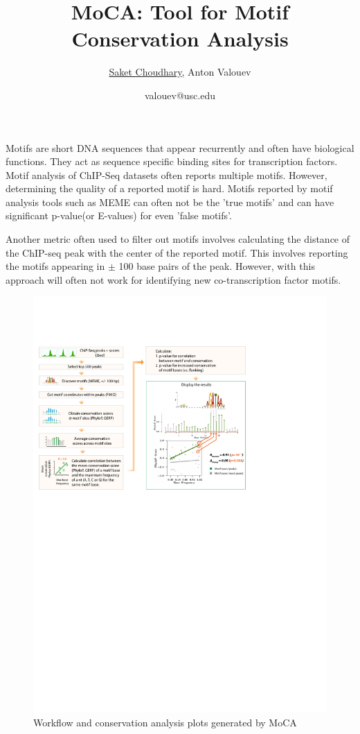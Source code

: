 \documentclass[16pt,a4paper]{article}
\title{\textbf{MoCA: Tool for Motif Conservation Analysis}}
\author{\underline{Saket Choudhary}, Anton Valouev}
\date{valouev@usc.edu}
\begin{document}
\maketitle
Motifs are short DNA sequences that appear recurrently and often have biological functions. They act as sequence specific binding sites for transcription factors. Motif analysis of ChIP-Seq datasets often reports multiple motifs. However, determining the quality of a reported motif is hard. Motifs reported by motif analysis tools such as MEME\cite{bailey2015meme} can often not be the 'true motifs' and  can have significant p-value(or E-values) for even 'false motifs'. 


Another metric often used to filter out motifs involves calculating the distance of the ChIP-seq peak with the center of the reported motif. This involves reporting the motifs appearing in $\pm$ 100 base pairs of the peak. 
However, with this approach will often not work for
identifying new co-transcription factor motifs.

\begin{figure}
	\centering
	\includegraphics[scale=0.7]{workflow}
	\caption {Workflow and conservation analysis plots generated by MoCA}
\end{figure}
\end{document}
